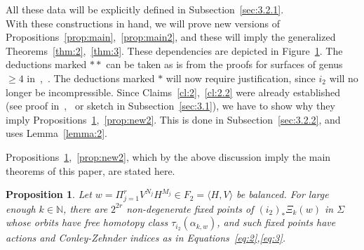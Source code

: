 \documentclass[11pt]{article}
\newtheorem{prop}[theorem]{Proposition}
\newcommand{\N}{\mathbb{N}}
\begin{document}
        \begin{center}\end{center}
        
        All these data will be explicitly defined in Subsection~\ref{sec:3.2.1}. \\
        
        With these constructions in hand, we will prove new versions of Propositions~\ref{prop:main},~\ref{prop:main2}, and these will imply the generalized Theorems~\ref{thm:2},~\ref{thm:3}. These dependencies are depicted in Figure~\ref{fig:new_depends}. The deductions marked $**$ can be taken as is from the proofs for surfaces of genus $\geq 4$ in~\cite{PS14},~\cite{10}. The deductions marked $*$ will now require justification, since $i_2$ will no longer be incompressible. Since Claims~\ref{cl:2},~\ref{cl:2.2} were already established (see proof in~\cite{PS14},~\cite{10} or sketch in Subsection~\ref{sec:3.1}), we have to show why they imply Propositions~\ref{prop:new},~\ref{prop:new2}. This is done in Subsection~\ref{sec:3.2.2}, and uses Lemma~\ref{lemma:2}.
        
        \begin{figure}[omitted: a diagram of this paper's results, not reproduced here]\label{fig:new_depends}\end{figure}

        Propositions~\ref{prop:new},~\ref{prop:new2}, which by the above discussion imply the main theorems of this paper, are stated here.
        
        \begin{prop}
        \label{prop:new}
            Let $w = \Pi_{j=1}^r V^{N_j} H^{M_j} \in F_2 = \langle H,V \rangle$ be balanced. For large enough $k \in \N$, there are $2^{2r}$ non-degenerate fixed points of $(i_2)_* \Xi_k(w)$ in $\Sigma$ whose orbits have free homotopy class $\tau_{i_2}(\alpha_{k,w})$, and such fixed points have actions and Conley-Zehnder indices as in Equations~\ref{eq:2},\ref{eq:3}.
        \end{prop}
        
\end{document}
